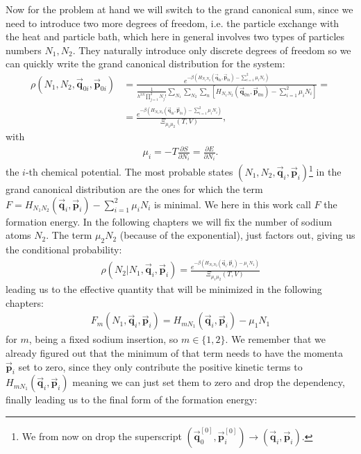 Now for the problem at hand we will switch to the grand canonical sum, since we need to introduce two more degrees of freedom, i.e. the particle exchange with the heat and particle bath, which here in general involves two types of particles numbers $N_1,N_2$. They naturally introduce only discrete degrees of freedom so we can quickly write the grand canonical distribution for the system:
\begin{align}
	\rho(N_1,N_2,\vec{\mathbf{q}}_{0i},\vec{\mathbf{p}}_{0i})&=\frac{e^{-\beta\left(H_{N_1N_2}(\vec{\mathbf{q}}_{0i},\vec{\mathbf{p}}_{0i})-\sum_{i=1}^{2}\mu_i N_i\right)}}{\frac{1}{h^{3N}\prod_{j=1}^{2}N_j!}\sum_{N_1}\sum_{N_2}\sum_{n}\left[H_{N_1N_2}(\vec{\mathbf{q}}_{0n},\vec{\mathbf{p}}_{0n})-\sum_{i=1}^{2}\mu_i N_i\right]}=\\
	&=\frac{e^{-\beta\left(H_{N_1N_2}(\vec{\mathbf{q}}_{0i},\vec{\mathbf{p}}_{0i})-\sum_{i=1}^{2}\mu_i N_i\right)}}{\Xi_{\mu_1\mu_2}(T,V)},
\end{align}
with 
\begin{align}
\mu_i = -T \frac{\partial S}{\partial N_i}=\frac{\partial E}{\partial N_i}.
\end{align} the $i$-th chemical potential.
The most probable states $(N_1,N_2,\vec{\mathbf{q}}_{i},\vec{\mathbf{p}}_{i})$\footnote{We from now on drop the superscript $(\vec{\mathbf{q}}_{0}^{[0]},\vec{\mathbf{p}}_{i}^{[0]}) \rightarrow (\vec{\mathbf{q}}_{i},\vec{\mathbf{p}}_{i})$.} in the grand canonical distribution are the ones for which the term $F = H_{N_1N_2}(\vec{\mathbf{q}}_i,\vec{\mathbf{p}}_i)-\sum_{i=1}^{2}\mu_i N_i$ is minimal. We here in this work call $F$ the formation energy. In the following chapters we will fix the number of sodium atoms $N_2$. The term $\mu_2 N_2$ (because of the exponential), just factors out, giving us the conditional probability:
\begin{align}
	\rho(N_2 | N_1,\vec{\mathbf{q}}_{i},\vec{\mathbf{p}}_{i})=\frac{e^{-\beta\left(H_{N_1N_2}(\vec{\mathbf{q}}_{i},\vec{\mathbf{p}}_{i})-\mu_1 N_1\right)}}{\Xi_{\mu_1\mu_2}(T,V)}
\end{align}
leading us to the effective quantity that will be minimized in the following chapters:
\begin{align}
	F_m(N_1,\vec{\mathbf{q}}_{i},\vec{\mathbf{p}}_{i}) = H_{mN_1}(\vec{\mathbf{q}}_{i},\vec{\mathbf{p}}_{i}) - \mu_1 N_1
\end{align}for $m$, being a fixed sodium insertion, so $m\in\{1,2\}$. We remember that we already figured out that the minimum of that term needs to have the momenta $\vec{\mathbf{p}}_i$ set to zero, since they only contribute the positive kinetic terms to $H_{mN_1}(\vec{\mathbf{q}}_{i},\vec{\mathbf{p}}_{i})$ meaning we can just set them to zero and drop the dependency, finally leading us to the final form of the formation energy:
